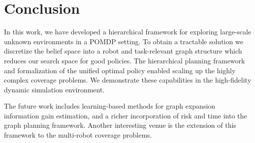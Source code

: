 \documentclass{article}
\begin{document}
\section{Conclusion}\label{sec:conclusion}

In this work, we have developed a hierarchical framework for exploring large-scale unknown environments in a POMDP setting. 
To obtain a tractable solution we discretize the belief space into a robot and task-relevant graph structure which reduces our search space for good policies.
The hierarchical planning framework and formalization of the unified optimal policy enabled scaling up the highly complex coverage problems.
We demonstrate these capabilities in the high-fidelity dynamic simulation environment.  

The future work includes learning-based methods for graph expansion information gain estimation, and a richer incorporation of risk and time into the graph planning framework.
Another interesting venue is the extension of this framework to the multi-robot coverage problems.



\clearpage{}







\end{document}

